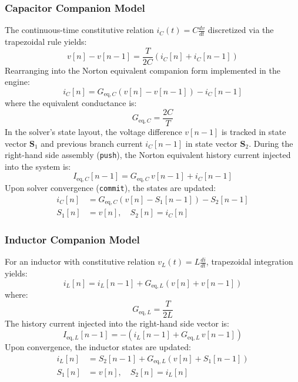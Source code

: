 \documentclass[fleqn,final]{jaes}
\begin{document}
\subsubsection{Capacitor Companion Model}
The continuous-time constitutive relation $i_C(t) = C \frac{dv}{dt}$ discretized via the trapezoidal rule yields:
\begin{equation}
v[n] - v[n-1] = \frac{T}{2C} \left( i_C[n] + i_C[n-1] \right)
\end{equation}
Rearranging into the Norton equivalent companion form implemented in the engine:
\begin{equation}
i_C[n] = G_{\text{eq}, C} \left( v[n] - v[n-1] \right) - i_C[n-1]
\end{equation}
where the equivalent conductance is:
\begin{equation}
G_{\text{eq}, C} = \frac{2C}{T}
\end{equation}
In the solver's state layout, the voltage difference $v[n-1]$ is tracked in state vector $\mathbf{S}_1$ and previous branch current $i_C[n-1]$ in state vector $\mathbf{S}_2$. During the right-hand side assembly (\texttt{push}), the Norton equivalent history current injected into the system is:
\begin{equation}
I_{\text{eq}, C}[n-1] = G_{\text{eq}, C} \, v[n-1] + i_C[n-1]
\end{equation}
Upon solver convergence (\texttt{commit}), the states are updated:
\begin{align}
i_C[n] &= G_{\text{eq}, C} \left( v[n] - S_1[n-1] \right) - S_2[n-1] \\
S_1[n] &= v[n], \quad S_2[n] = i_C[n]
\end{align}

\subsubsection{Inductor Companion Model}
For an inductor with constitutive relation $v_L(t) = L \frac{di}{dt}$, trapezoidal integration yields:
\begin{equation}
i_L[n] = i_L[n-1] + G_{\text{eq}, L} \left( v[n] + v[n-1] \right)
\end{equation}
where:
\begin{equation}
G_{\text{eq}, L} = \frac{T}{2L}
\end{equation}
The history current injected into the right-hand side vector is:
\begin{equation}
I_{\text{eq}, L}[n-1] = - \left( i_L[n-1] + G_{\text{eq}, L} \, v[n-1] \right)
\end{equation}
Upon convergence, the inductor states are updated:
\begin{align}
i_L[n] &= S_2[n-1] + G_{\text{eq}, L} \left( v[n] + S_1[n-1] \right) \\
S_1[n] &= v[n], \quad S_2[n] = i_L[n]
\end{align}
\end{document}
